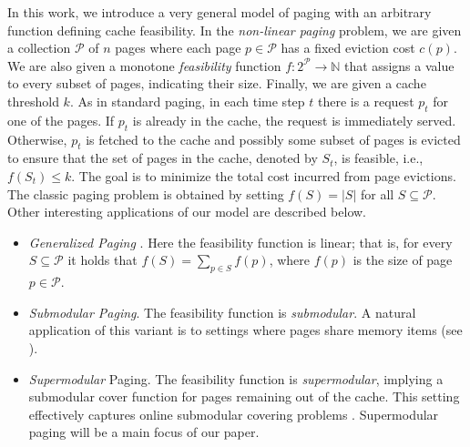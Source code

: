 \documentclass[11pt]{article}
\newcommand{\cP}{{\mathcal{P}}}
\begin{document}
In this work, we introduce a very general model of paging with an arbitrary function defining cache feasibility. In the {\em non-linear paging} problem, we are given a collection $\cP$ of $n$ pages where each page $p \in \cP$ has a fixed eviction cost $c(p)$. We are also given a monotone {\em feasibility} function $f:2^{\cP} \rightarrow \mathbb{N}$ that assigns a value to every subset of pages, indicating their size. Finally, we are given a cache threshold $k$. As in standard paging, in each time step $t$ there is a request $p_t$ for one of the pages. If $p_t$ is already in the cache, the request is immediately served. Otherwise, $p_t$ is fetched to the cache and possibly some subset of pages is evicted to ensure that the set of pages in the cache, denoted by $S_{t}$, is feasible, i.e., $f\left( S_{t}  \right) \leq k$. The goal is to minimize the total cost incurred from page evictions. 
%
The classic paging problem is obtained by setting $f(S) = |S|$ for all $S \subseteq \cP$. Other interesting applications of our model are described below. 

\begin{itemize}
\item  {\em Generalized Paging} \cite{bansal2012randomized,adamaszek2018log}. Here the feasibility function is linear; that is, for every $S \subseteq \cP$ it holds that $f(S) = \sum_{p \in S} f(p)$, where $f(p)$ is the size of page $p \in \cP$.
\item 	{\em Submodular Paging}. The feasibility function is {\em submodular}. A natural application of this variant is to settings where pages share memory items (see ). 
	
	
	
	
	
	
\item 	{\em Supermodular} Paging. The feasibility function is {\em supermodular}, implying a submodular cover function for pages remaining out of the cache. This setting effectively captures online submodular covering problems \cite{alon2003online,korman2004use,gupta2020online}. Supermodular paging will be a main focus of our paper.  
\end{itemize}
\end{document}
